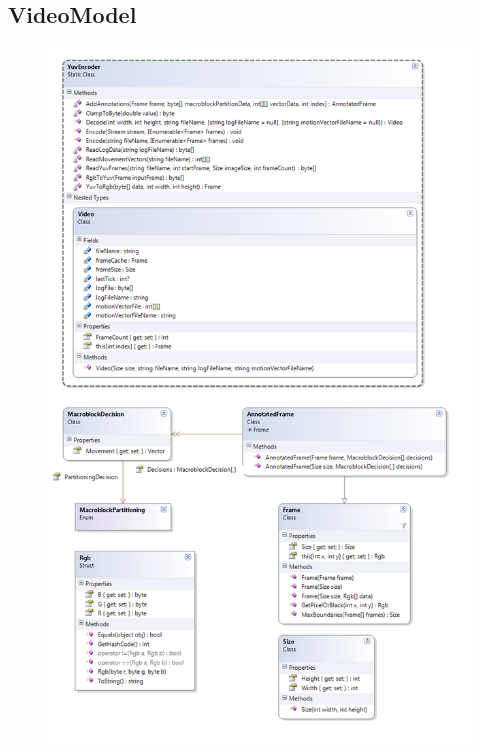 \subsection{VideoModel}
\begin{figure}[h!]
\begin{center}
\includegraphics[height=0.8\textheight]{classdiagram/videomodel.png}
\end{center}
\end{figure}
\newpage

